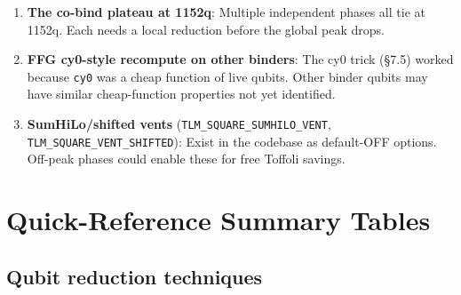 \documentclass[11pt,a4paper]{article}
\begin{document}
\begin{enumerate}
  \item \textbf{The co-bind plateau at 1152q}: Multiple independent phases all tie at 1152q.
    Each needs a local reduction before the global peak drops.

  \item \textbf{FFG cy0-style recompute on other binders}: The cy0 trick (\S7.5) worked because
    \texttt{cy0} was a cheap function of live qubits. Other binder qubits may have similar
    cheap-function properties not yet identified.

  \item \textbf{SumHiLo/shifted vents} (\texttt{TLM\_SQUARE\_SUMHILO\_VENT},
    \texttt{TLM\_SQUARE\_VENT\_SHIFTED}): Exist in the codebase as default-OFF options. Off-peak
    phases could enable these for free Toffoli savings.
\end{enumerate}

\section{Quick-Reference Summary Tables}
\label{sec:tables}

\subsection{Qubit reduction techniques}
\end{document}
